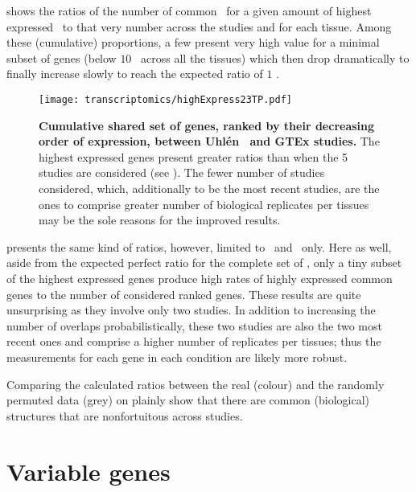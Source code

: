  shows the ratios of the number of
common \pcgs\ for a given amount of highest expressed \pcgs\
to that very number across the studies and for each tissue.
Among these (cumulative) proportions,
a few present very high value for
a minimal subset of genes (below $10$ \FPKM\ across all the tissues)
which then drop dramatically to finally increase slowly
to reach the expected ratio of $1$ \FPKM{}.
\begin{comment}
as the \pcgs\ set across the studies is identical.
\end{comment}

\begin{figure}[!htb]
    \texttt{[image: transcriptomics/highExpress23TP.pdf]}\centering
    \caption[Cumulative shared set of genes, sorted by their expression, between
    Uhlen and GTEx]{\label{fig:highExpress23T}\textbf{Cumulative shared set of
    genes, ranked by their decreasing order of expression, between Uhlén \etal\
    and GTEx studies.}
    The highest expressed genes present greater ratios than
    when the 5 studies are considered (see ).
    The fewer number of studies considered, which, additionally to be the most
    recent studies, are the ones to comprise greater number of biological
    replicates per tissues may be the sole reasons for the improved results.}
\end{figure}

 presents the same kind of ratios,
however, limited to \uhlen\ and \gtex\ only.
Here as well, aside from the expected perfect ratio for the complete set of
\pcgs,
only a tiny subset of the highest expressed genes produce high rates of
highly expressed common genes to the number of considered ranked genes.
These results are quite unsurprising as they involve only two studies.
In addition to increasing the number of overlaps probabilistically,
these two studies are also the two most recent ones
and comprise a higher number of replicates per tissues;
thus the measurements for each gene in each condition are likely more robust.

Comparing the calculated ratios between the real (colour) and
the randomly permuted data (grey)
on \Cref{fig:highExpress4T,fig:highExpress23T}
plainly show that there are common (biological) structures
that are nonfortuitous across studies.
\FloatBarrier\
\section{Variable genes}

